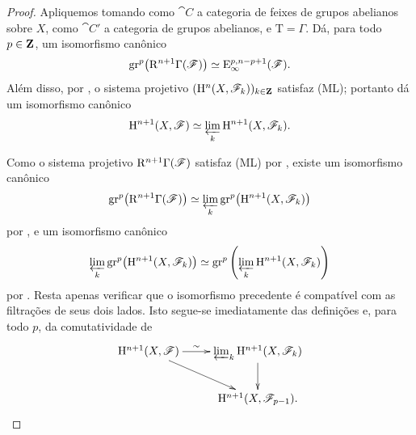 \begin{proof}
Apliquemos  tomando como $\cat{C}$ a categoria de feixes de
grupos abelianos sobre $X$, como $\cat{C}'$ a categoria de grupos abelianos,
e $\mathrm{T}=\Gamma$.
Dá, para todo $p\in\mathbf{Z}$, um isomorfismo canônico
\[
  \mathrm{gr}^p\bigl(\mathrm{R}^{n+1}\Gamma(\mathscr{F})\bigr)
  \simeq
  \mathrm{E}_\infty^{p,n-p+1}(\mathscr{F}).
\]
Além disso, por , o sistema projetivo
$(\mathrm{H}^n(X,\mathscr{F}_k))_{k\in\mathbf{Z}}$ satisfaz {\rm(ML)}; portanto
 dá um isomorfismo canônico
\[
  \mathrm{H}^{n+1}(X,\mathscr{F})
  \simeq
  \varprojlim_k\mathrm{H}^{n+1}(X,\mathscr{F}_k).
\]

Como o sistema projetivo
$\mathrm{R}^{n+1}\Gamma(\mathscr{F})$ satisfaz {\rm(ML)} por
, existe um isomorfismo canônico
\[
  \mathrm{gr}^p\bigl(\mathrm{R}^{n+1}\Gamma(\mathscr{F})\bigr)
  \simeq
  \varprojlim_k
  \mathrm{gr}^p\bigl(\mathrm{H}^{n+1}(X,\mathscr{F}_k)\bigr)
\]
por , e um isomorfismo canônico
\[
  \varprojlim_k
  \mathrm{gr}^p\bigl(\mathrm{H}^{n+1}(X,\mathscr{F}_k)\bigr)
  \simeq
  \mathrm{gr}^p\left(
    \varprojlim_k\mathrm{H}^{n+1}(X,\mathscr{F}_k)
  \right)
\]
por .
Resta apenas verificar que o isomorfismo precedente é
compatível com as filtrações de seus dois lados.
Isto segue-se imediatamente das definições e, para todo $p$,
da comutatividade de
\[
  \xymatrix{
    \HH^{n+1}(X,\sh{F})
      \ar[r]^-{\sim}\ar[dr]
    &
    \varprojlim_k\HH^{n+1}(X,\sh{F}_k)
      \ar[d]
    \\
    &
    \HH^{n+1}(X,\sh{F}_{p-1}).
  }
\]
\end{proof}

